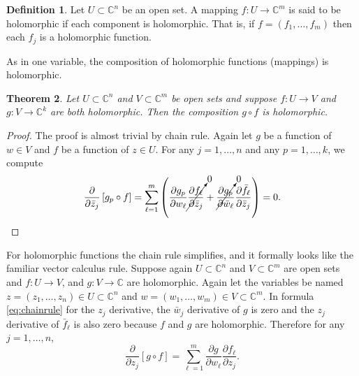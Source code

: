 \documentclass[12pt,openany]{book}
\newcommand{\C}{{\mathbb{C}}}
\theoremstyle{plain}
\newtheorem{thm}{Theorem}[section]
\theoremstyle{remark}
\theoremstyle{definition}
\newtheorem{defn}[thm]{Definition}
\theoremstyle{exercise}
\theoremstyle{example}
\begin{document}
\begin{defn}
Let $U \subset \C^n$ be an open set.  A mapping $f \colon U \to \C^m$
is said to be holomorphic if each component is holomorphic.  That
is, if $f = (f_1,\ldots,f_m)$ then each $f_j$ is a holomorphic function.
\end{defn}

As in one variable, the composition of holomorphic functions (mappings) is
holomorphic.

\begin{thm}
Let $U \subset \C^n$ and $V \subset \C^m$ be open sets and suppose
$f \colon U \to V$ and $g \colon V \to \C^k$ are both holomorphic.
%
Then the composition $g \circ f$ is holomorphic.
\end{thm}

\begin{proof}
The proof is almost trivial by chain rule.
Again let $g$ be a function of $w \in V$ and $f$ be a function of $z \in U$.
For any $j = 1,\ldots,n$ and any $p=1,\ldots,k$, we compute
\begin{equation*}
\frac{\partial}{\partial \bar{z}_j} \left[ g_p \circ f \right]
=
\sum_{\ell=1}^m 
\left(
\frac{\partial g_p}{\partial w_\ell} 
\cancelto{0}{\frac{\partial f_\ell}{\partial \bar{z}_j}}
+
\cancelto{0}{\frac{\partial g_p}{\partial \bar{w}_\ell}}
\frac{\partial \bar{f}_\ell}{\partial \bar{z}_j} 
\right)
=
0 . \qedhere
\end{equation*}
\end{proof}

For holomorphic functions the chain rule simplifies, and it formally looks
like the familiar vector calculus rule.
Suppose again
$U \subset \C^n$ and $V \subset \C^m$ are open sets and 
$f \colon U \to V$, and $g \colon V \to \C$ are holomorphic.
Again let the variables be named
$z = (z_1,\ldots,z_n) \in U \subset \C^n$ and $w = (w_1,\ldots,w_m) \in V
\subset \C^m$.  In formula \eqref{eq:chainrule} for the $z_j$ derivative,
the $\bar{w}_j$ derivative of $g$ is zero and the $z_j$ derivative of
$\bar{f}_\ell$ is also zero because $f$ and $g$ are holomorphic.
Therefore for any $j=1,\ldots,n$,
\begin{equation*}
\frac{\partial}{\partial z_j} \left[ g \circ f \right]
=
\sum_{\ell=1}^m 
\frac{\partial g}{\partial w_\ell}
\frac{\partial f_\ell}{\partial z_j} .
\end{equation*}
\end{document}
